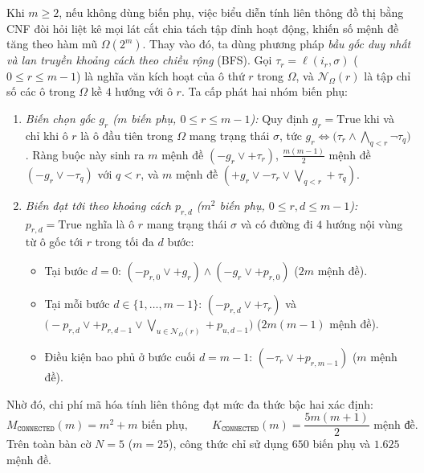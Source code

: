 \begin{itemize}
    Khi $m \ge 2$, nếu không dùng biến phụ, việc biểu diễn tính liên thông đồ thị bằng CNF đòi hỏi liệt kê mọi lát cắt chia tách tập đỉnh hoạt động, khiến số mệnh đề tăng theo hàm mũ $\Omega(2^m)$. Thay vào đó, ta dùng phương pháp \textit{bầu gốc duy nhất và lan truyền khoảng cách theo chiều rộng} (BFS). Gọi $\tau_r = \ell(i_r, \sigma)$ ($0 \le r \le m - 1$) là nghĩa văn kích hoạt của ô thứ $r$ trong $\Omega$, và $\mathcal{N}_\Omega(r)$ là tập chỉ số các ô trong $\Omega$ kề $4$ hướng với ô $r$. Ta cấp phát hai nhóm biến phụ:
    \begin{enumerate}
        \item \textit{Biến chọn gốc $g_r$ ($m$ biến phụ, $0 \le r \le m - 1$):} Quy định $g_r = \text{True}$ khi và chỉ khi ô $r$ là ô đầu tiên trong $\Omega$ mang trạng thái $\sigma$, tức $g_r \Leftrightarrow \big(\tau_r \land \bigwedge_{q < r} \neg \tau_q\big)$. Ràng buộc này sinh ra $m$ mệnh đề $(-g_r \lor +\tau_r)$, $\frac{m(m-1)}{2}$ mệnh đề $(-g_r \lor -\tau_q)$ với $q < r$, và $m$ mệnh đề $(+g_r \lor -\tau_r \lor \bigvee_{q < r} +\tau_q)$.
        \item \textit{Biến đạt tới theo khoảng cách $p_{r, d}$ ($m^2$ biến phụ, $0 \le r, d \le m - 1$):} $p_{r, d} = \text{True}$ nghĩa là ô $r$ mang trạng thái $\sigma$ và có đường đi $4$ hướng nội vùng từ ô gốc tới $r$ trong tối đa $d$ bước:
        \begin{itemize}
            \item Tại bước $d = 0$: $(-p_{r, 0} \lor +g_r) \land (-g_r \lor +p_{r, 0})$ ($2m$ mệnh đề).
            \item Tại mỗi bước $d \in \{1, \dots, m - 1\}$: $(-p_{r, d} \lor +\tau_r)$ và $\big(-p_{r, d} \lor +p_{r, d-1} \lor \bigvee_{u \in \mathcal{N}_\Omega(r)} +p_{u, d-1}\big)$ ($2m(m - 1)$ mệnh đề).
            \item Điều kiện bao phủ ở bước cuối $d = m - 1$: $(-\tau_r \lor +p_{r, m-1})$ ($m$ mệnh đề).
        \end{itemize}
    \end{enumerate}
    Nhờ đó, chi phí mã hóa tính liên thông đạt mức đa thức bậc hai xác định:
    \begin{equation}
        M_{\texttt{CONNECTED}}(m) = m^2 + m \text{ biến phụ}, \qquad K_{\texttt{CONNECTED}}(m) = \frac{5m(m + 1)}{2} \text{ mệnh đề}.
    \end{equation}
    Trên toàn bàn cờ $N = 5$ ($m = 25$), công thức chỉ sử dụng $650$ biến phụ và $1.625$ mệnh đề.
\end{itemize}

